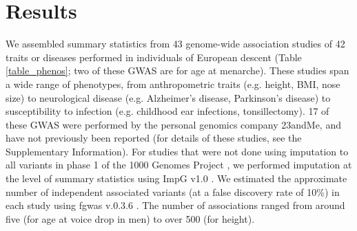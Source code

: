 \documentclass[11pt,titlepage]{article}
\begin{document}
\section{Results}
We assembled summary statistics from 43 genome-wide association studies of 42 traits or diseases performed in individuals of European descent (Table \ref{table_phenos}; two of these GWAS are for age at menarche). 
These studies span a wide range of phenotypes, from anthropometric traits (e.g. height, BMI, nose size) to neurological disease (e.g. Alzheimer's disease, Parkinson's disease) to susceptibility to infection (e.g. childhood ear infections, tonsillectomy).
17 of these GWAS were performed by the personal genomics company 23andMe, and have not previously been reported (for details of these studies, see the Supplementary Information). For studies that were not done using imputation to all variants in phase 1 of the 1000 Genomes Project \citep{abecasis2010map}, we performed imputation at the level of summary statistics using ImpG v1.0 \citep{Pasaniuc:2014aa}. 
We estimated the approximate number of independent associated variants (at a false discovery rate of 10\%) in each study using fgwas v.0.3.6 \citep{pickrell2013joint}. 
The number of associations ranged from around five (for age at voice drop in men) to over 500 (for height). 
\end{document}
